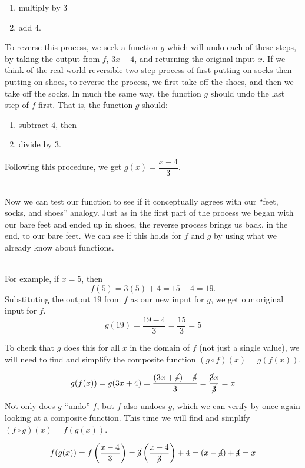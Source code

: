 \documentclass[12pt]{article}
\theoremstyle{definition}
\begin{document}
\begin{enumerate}
	\item multiply by $3$ 
	\item add $4$. 
\end{enumerate}

To reverse this process, we seek a function $g$ which will undo each of these steps, by taking the output from $f$, $3x+4$, and returning the original input $x$.  If we think of the real-world reversible two-step process of first putting on socks then putting on shoes, to reverse the process, we first take off the shoes, and then we take off the socks.  In much the same way, the function $g$ should undo the last step of $f$ first.  That is, the function $g$ should:

\begin{enumerate}
	\item subtract  $4$, then 
	\item divide by $3$. 
\end{enumerate}

Following this procedure, we get $g(x) = \dfrac{x-4}{3}$.\\
\ \par
Now we can test our function to see if it conceptually agrees with our ``feet, socks, and shoes'' analogy.  Just as in the first part of the process we began with our bare feet and ended up in shoes, the reverse process brings us back, in the end, to our bare feet.  We can see if this holds for $f$ and $g$ by using what we already know about functions.\\
\ \par
For example, if $x=5$, then $$f(5) = 3(5)+4 = 15+4 = 19.$$
Substituting the output $19$ from $f$ as our new input for $g$, we get our original input for $f$.
$$g(19) = \dfrac{19-4}{3} = \dfrac{15}{3} = 5$$

To check that $g$ does this for all $x$ in the domain of $f$ (not just a single value), we will need to find and simplify the composite function $(g\circ f)(x)=g(f(x))$.

$$g(f(x)) = g(3x+4) = \dfrac{(3x+\cancel{4})-\cancel{4}}{3} = \dfrac{\cancel{3}x}{\cancel{3}} = x$$

Not only does $g$ ``undo'' $f$, but $f$ also undoes $g$, which we can verify by once again looking at a composite function.  This time we will find and simplify $(f\circ g)(x)=f(g(x))$.

$$f(g(x)) = f\left(\dfrac{x-4}{3}\right) = \cancel{3} \left(\dfrac{x-4}{\cancel{3}}\right) + 4 = (x-\cancel{4}) + \cancel{4} = x$$
\end{document}
